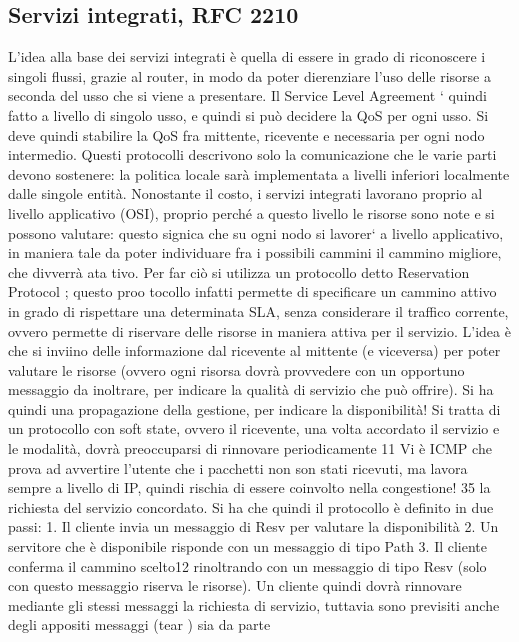 \subsection{Servizi integrati, RFC 2210}
L'idea alla base dei servizi integrati è quella di essere in grado di riconoscere i
singoli flussi, grazie al router, in modo da poter dierenziare l'uso delle risorse
a seconda del usso che si viene a presentare. Il Service Level Agreement `
quindi fatto a livello di singolo usso, e quindi si può decidere la QoS per ogni
usso. Si deve quindi stabilire la QoS fra mittente, ricevente e necessaria per
ogni nodo intermedio. Questi protocolli descrivono solo la comunicazione che
le varie parti devono sostenere: la politica locale sarà implementata a livelli
inferiori localmente dalle singole entità.
Nonostante il costo, i servizi integrati lavorano proprio al livello applicativo
(OSI), proprio perché a questo livello le risorse sono note e si possono valutare:
questo signica che su ogni nodo si lavorer` a livello applicativo, in maniera tale
da poter individuare fra i possibili cammini il cammino migliore, che divverrà ata
tivo. Per far ciò si utilizza un protocollo detto Reservation Protocol ; questo proo
tocollo infatti permette di specificare un cammino attivo in grado di rispettare
una determinata SLA, senza considerare il traffico corrente, ovvero permette di
riservare delle risorse in maniera attiva per il servizio. L'idea è che si inviino
delle informazione dal ricevente al mittente (e viceversa) per poter valutare le
risorse (ovvero ogni risorsa dovrà provvedere con un opportuno messaggio da
inoltrare, per indicare la qualità di servizio che può offrire). Si ha quindi una
propagazione della gestione, per indicare la disponibilità!
Si tratta di un protocollo con soft state, ovvero il ricevente, una volta accordato il servizio e le modalità, dovrà
preoccuparsi di rinnovare periodicamente
11 Vi è ICMP che prova ad avvertire l'utente che i pacchetti non son stati ricevuti, ma lavora
sempre a livello di IP, quindi rischia di essere coinvolto nella congestione!
35
la richiesta del servizio concordato. Si ha che quindi il protocollo è definito in
due passi:
1. Il cliente invia un messaggio di Resv per valutare la disponibilità
2. Un servitore che è disponibile risponde con un messaggio di tipo Path
3. Il cliente conferma il cammino scelto12 rinoltrando con un messaggio di
tipo Resv (solo con questo messaggio riserva le risorse).
Un cliente quindi dovrà rinnovare mediante gli stessi messaggi la richiesta di
servizio, tuttavia sono previsiti anche degli appositi messaggi (tear ) sia da parte
